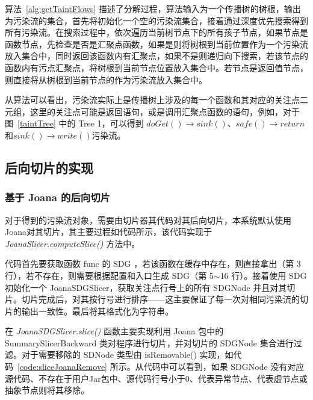 算法~\ref{alg:getTaintFlows} 描述了分解过程，算法输入为一个传播树的树根，输出为污染流的集合，首先将初始化一个空的污染流集合，接着通过深度优先搜索得到所有污染流。在搜索过程中，依次遍历当前树节点下的所有孩子节点，如果节点是函数节点，先检查是否是汇聚点函数，如果是则将树根到当前位置作为一个污染流放入集合中，同时返回该函数内有汇聚点，如果不是则递归向下搜索，若该节点的函数内有污点汇聚点，将树根到当前节点位置放入集合中。若节点是返回值节点，则直接将从树根到当前节点的作为污染流放入集合中。

从算法可以看出，污染流实际上是传播树上涉及的每一个函数和其对应的关注点二元组，这里的关注点可能是返回语句，或是调用汇聚点函数的语句，例如，对于图~\ref{taintTree} 中的 Tree 1，可以得到 $doGet() \rightarrow sink()$、$safe() \rightarrow return$和$sink() \rightarrow write()$污染流。\\

\subsection{后向切片的实现}
\subsubsection{基于 Joana 的后向切片}
对于得到的污染流对象，需要由切片器其代码对其后向切片，本系统默认使用Joana对其切片，其主要过程如代码所示，该代码实现于 \textit{JoanaSlicer.computeSlice()} 方法中。

\begin{minipage}[!htbp]{0.9\textwidth}
    
\end{minipage}

代码首先要获取函数 func 的 SDG ，若该函数在缓存中存在，则直接拿出（第 3 行），若不存在，则需要根据配置和入口生成 SDG（第 5$\sim$16 行）。接着使用 SDG 初始化一个 JoanaSDGSlicer，获取关注点行号上的所有 SDGNode 并且对其切片。切片完成后，对其按行号进行排序——这主要保证了每一次对相同污染流的切片的输出一致性。最后将其格式化为字符串。

在 \textit{JoanaSDGSlicer.slice()} 函数主要实现利用 Joana 包中的 SummarySlicerBackward 类对程序进行切片，并对切片的 SDGNode 集合进行过滤。对于需要移除的 SDNode 类型由 isRemovable() 实现，如代码~\ref{code:sliceJoanaRemove} 所示。从代码中可以看到，如果 SDGNode 没有对应源代码、不存在于用户Jar包中、源代码行号小于0、代表异常节点、代表虚节点或抽象节点则将其移除。

\begin{minipage}[!htbp]{0.9\textwidth}
    
\end{minipage}



